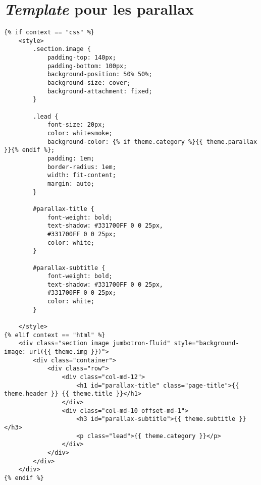 \documentclass{article}
\begin{document}
\section{\textit{Template} pour les parallax}
\begin{verbatim}
{% if context == "css" %}
    <style>
        .section.image {
            padding-top: 140px;
            padding-bottom: 100px;
            background-position: 50% 50%;
            background-size: cover;
            background-attachment: fixed;
        }

        .lead {
            font-size: 20px;
            color: whitesmoke;
            background-color: {% if theme.category %}{{ theme.parallax }}{% endif %};
            padding: 1em;
            border-radius: 1em;
            width: fit-content;
            margin: auto;
        }

        #parallax-title {
            font-weight: bold;
            text-shadow: #331700FF 0 0 25px,
            #331700FF 0 0 25px;
            color: white;
        }

        #parallax-subtitle {
            font-weight: bold;
            text-shadow: #331700FF 0 0 25px,
            #331700FF 0 0 25px;
            color: white;
        }

    </style>
{% elif context == "html" %}
    <div class="section image jumbotron-fluid" style="background-image: url({{ theme.img }})">
        <div class="container">
            <div class="row">
                <div class="col-md-12">
                    <h1 id="parallax-title" class="page-title">{{ theme.header }} {{ theme.title }}</h1>
                </div>
                <div class="col-md-10 offset-md-1">
                    <h3 id="parallax-subtitle">{{ theme.subtitle }}</h3>
                    <p class="lead">{{ theme.category }}</p>
                </div>
            </div>
        </div>
    </div>
{% endif %}
\end{verbatim}
\end{document}

